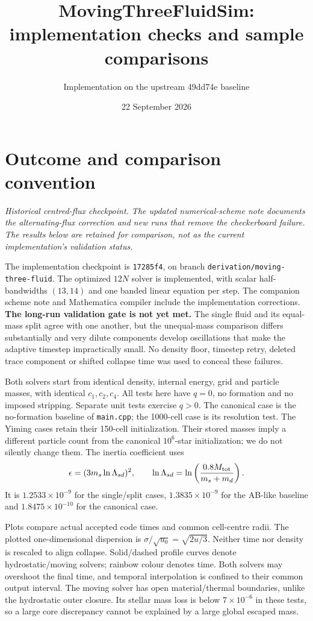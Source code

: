 \documentclass[11pt]{article}
\title{MovingThreeFluidSim: implementation checks and sample comparisons}
\author{Implementation on the upstream 49dd74e baseline}
\date{22 September 2026}
\begin{document}
\maketitle

\section{Outcome and comparison convention}
\emph{Historical centred-flux checkpoint. The updated numerical-scheme note
documents the alternating-flux correction and new runs that remove the
checkerboard failure. The results below are retained for comparison, not
as the current implementation's validation status.}

The implementation checkpoint is \texttt{17285f4}, on branch
\texttt{derivation/moving-three-fluid}.
The optimized $12N$ solver is implemented, with scalar half-bandwidths
$(13,14)$ and one banded linear equation per step. The companion scheme
note and Mathematica compiler include the implementation corrections.
\textbf{The long-run validation gate is not yet met.} The single fluid
and its equal-mass split agree with one another, but the unequal-mass
comparison differs substantially and very dilute components develop
oscillations that make the adaptive timestep impractically small.
No density floor, timestep retry, deleted trace component or shifted
collapse time was used to conceal these failures.

Both solvers start from identical density, internal energy, grid and
particle masses, with identical $c_1,c_2,c_4$. All tests here have $q=0$,
no formation and no imposed stripping. Separate unit tests exercise $q>0$.
The canonical case is the no-formation baseline of \texttt{main.cpp};
the 1000-cell case is its resolution test. The Yiming cases retain their
150-cell initialization. Their stored masses imply a different particle
count from the canonical $10^6$-star initialization; we do not silently
change them. The inertia coefficient uses
\begin{equation}
 \epsilon=(3m_s\ln\Lambda_{sd})^2,\qquad
 \ln\Lambda_{sd}=\ln\left(\frac{0.8M_{\rm tot}}{m_s+m_d}\right).
\end{equation}
It is $1.2533\times10^{-9}$ for the single/split cases,
$1.3835\times10^{-9}$ for the AB-like baseline and
$1.8475\times10^{-10}$ for the canonical case.

Plots compare actual accepted code times and common cell-centre radii.
The plotted one-dimensional dispersion is $\sigma/\sqrt{u_0}=\sqrt{2u/3}$.
Neither time nor density is rescaled to align collapse. Solid/dashed
profile curves denote hydrostatic/moving solvers; rainbow colour denotes
time. Both solvers may overshoot the final time, and temporal interpolation
is confined to their common output interval. The moving solver has open
material/thermal boundaries, unlike the hydrostatic outer closure. Its
stellar mass loss is below $7\times10^{-6}$ in these tests, so a large
core discrepancy cannot be explained by a large global escaped mass.
\end{document}
